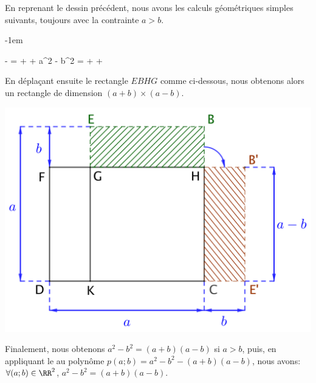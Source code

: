 \begin{example}
	En reprenant le dessin précédent, nous avons les calculs géométriques simples suivants, toujours avec la contrainte $a > b$.

	\leavevmode\kern-1em%
	\begin{stepcalc}[style=ar*, ope={\iff}]
    	 -  =  +  + 
	\explnext{}
    	a^2 - b^2 =  +  + 
	\end{stepcalc}

	En déplaçant ensuite le rectangle $EBHG$ comme ci-dessous, nous obtenons alors un rectangle de dimension $(a+b) \times (a-b)$. 

	\begin{center}
		\includegraphics[scale = .7]{a^2-b^2.png}
	\end{center}

	Finalement, nous obtenons $a^2 - b^2 = (a+b)(a-b)$ si $a > b$,
	puis,
	en appliquant le  au polynôme $p(a ; b) = a^2 - b^2 - (a+b)(a-b)$,
	nous avons:
	$\forall (a ; b) \in \RR^2$, $a^2 - b^2 = (a+b)(a-b)$.
\end{example}




